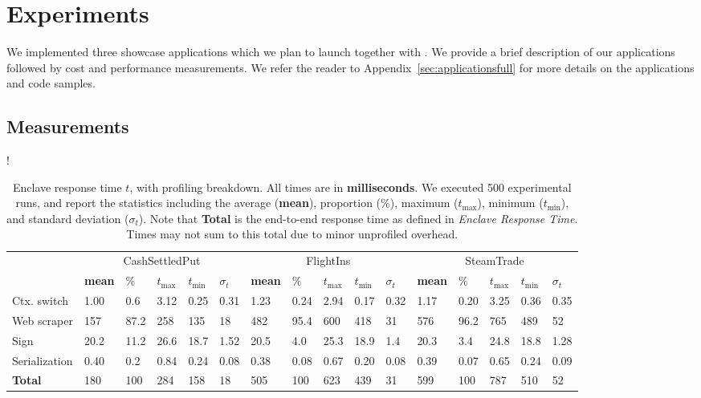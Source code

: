 \section{Experiments}
\label{sec:experiments}

We implemented three showcase applications which we plan to launch together with \tc.
We provide a brief description of our applications followed by cost and performance measurements.
We refer the reader to Appendix~\ref{sec:applicationsfull} for more details on the applications and code samples.



\subsection{Measurements}
\label{sec:experiments}

\begin{table*}
\resizebox{\linewidth} {!}{
\begin{tabular}{l|lllll|lllll|lllll}
\toprule
& \multicolumn{5}{c|}{\sf CashSettledPut} &
  \multicolumn{5}{c|}{\sf FlightIns} &
  \multicolumn{5}{c}{\sf SteamTrade} \\
    & \textbf{mean} & \% & $t_{\max}$ & $t_{\min}$ & $\sigma_t$ & \textbf{mean}
    & \% & $t_{\max}$ & $t_{\min}$ & $\sigma_t$ & \textbf{mean} & \% & $t_{\max}$
    & $t_{\min}$ & $\sigma_t$\\
\midrule
    Ctx. switch & 1.00 & 0.6 & 3.12 & 0.25 & 0.31 
                & 1.23 & 0.24 & 2.94 & 0.17 & 0.32 
                & 1.17 & 0.20 & 3.25 & 0.36 & 0.35\\
    Web scraper & 157  & 87.2 & 258 & 135 & 18 
                & 482  & 95.4 & 600 & 418 & 31 
                & 576  & 96.2 & 765 & 489 & 52\\
    Sign        & 20.2 & 11.2 & 26.6 & 18.7 & 1.52 
                & 20.5 & 4.0 & 25.3 & 18.9 & 1.4 
                & 20.3 & 3.4 & 24.8 & 18.8 & 1.28\\
    Serialization 
                & 0.40 & 0.2 & 0.84 & 0.24 & 0.08 
                & 0.38 & 0.08 & 0.67 & 0.20 & 0.08 
                & 0.39 & 0.07 & 0.65 & 0.24 & 0.09\\
\midrule
\midrule
    \textbf{Total} 
                & 180 & 100 & 284 & 158 & 18 
                & 505 & 100 & 623 & 439 & 31 
                & 599 & 100 & 787 & 510 & 52 \\
\bottomrule
\end{tabular}
}
\caption{Enclave response time $t$, with profiling breakdown. All times are in {\bf milliseconds}.
We executed 500 experimental runs, and report
the statistics including 
the average ({\bf mean}), proportion (\%), maximum ($t_{\max}$),
minimum ($t_{\min}$), and standard deviation ($\sigma_t$). Note that {\bf Total} is the end-to-end response time as 
defined in \emph{Enclave Response Time}. Times may not
sum to this total due to minor unprofiled overhead.}
\label{tab:eval_profiling}
\vspace{-1em}
\end{table*}

